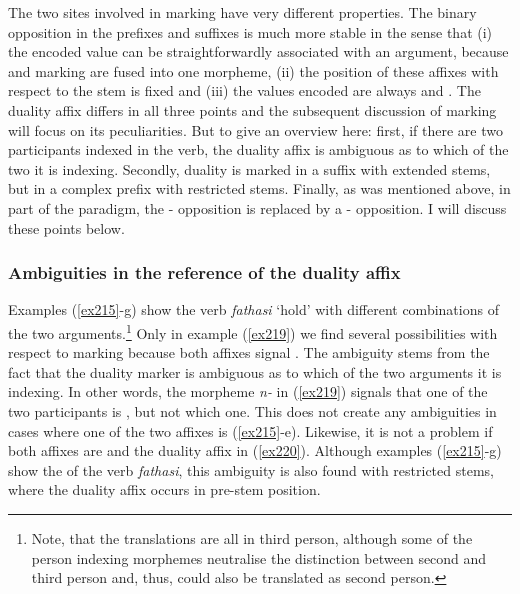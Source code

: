 The two sites involved in  marking have very different properties. The binary opposition in the  prefixes and suffixes is much more stable in the sense that (i) the encoded value can be straightforwardly associated with an argument, because  and  marking are fused into one morpheme, (ii) the position of these affixes with respect to the stem is fixed and (iii) the values encoded are always {\Sg} and {\Nsg}. The duality affix differs in all three points and the subsequent discussion of  marking will focus on its peculiarities. But to give an overview here: first, if there are two participants indexed in the verb, the duality affix is ambiguous as to which of the two it is indexing. Secondly, duality is marked in a suffix with extended stems, but in a complex  prefix with restricted stems. Finally, as was mentioned above, in part of the paradigm, the {\Du}-{\Ndu} opposition is replaced by a {\Pl}-{\Npl} opposition. I will discuss these points below.

\subsubsection{Ambiguities in the reference of the duality affix} \label{ambiguitiesdualref}

Examples (\ref{ex215}-g) show the verb \emph{fathasi} `hold' with different  combinations of the two arguments.\footnote{Note, that the  translations are all in third person, although some of the person indexing morphemes neutralise the distinction between second and third person and, thus, could also be translated as second person.} Only in example (\ref{ex219}) we find several possibilities with respect to  marking because both  affixes signal . The ambiguity stems from the fact that the duality marker is ambiguous as to which of the two arguments it is indexing. In other words, the  morpheme \emph{n-} in (\ref{ex219}) signals that one of the two participants is , but not which one. This does not create any ambiguities in cases where one of the two  affixes is  (\ref{ex215}-e). Likewise, it is not a problem if both  affixes are  and the duality affix in  (\ref{ex220}). Although examples (\ref{ex215}-g) show the  of the verb \emph{fathasi}, this ambiguity is also found with restricted stems, where the duality affix occurs in pre-stem position.

